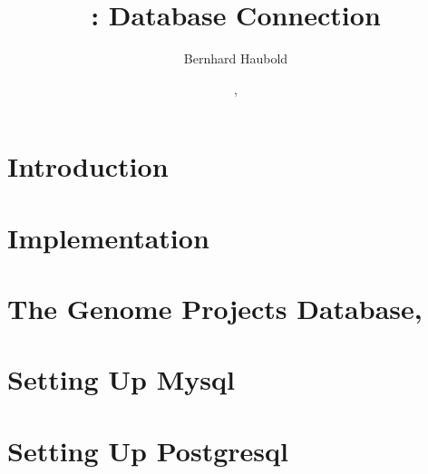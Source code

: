 \documentclass[a4paper]{report}
\begin{document}
\pagestyle{noweb}

\title{: Database Connection\\\scriptsize {}}
\author{Bernhard Haubold}
\date{\hspace{-3pt}, }
\maketitle

\tableofcontents

\chapter{Introduction}

\chapter{Implementation}

\chapter{The Genome Projects Database, }\label{ch:gpdb}

\chapter{Setting Up Mysql}

\chapter{Setting Up Postgresql}

\end{document}
